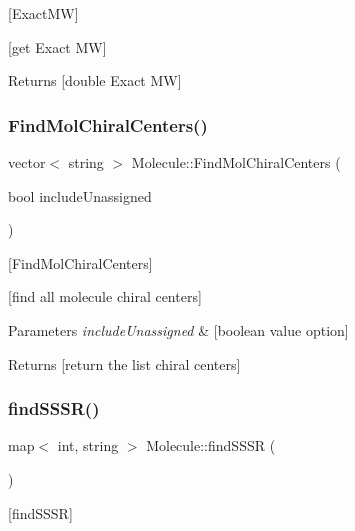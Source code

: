 \mbox{[}Exact\+MW\mbox{]} 

\mbox{[}get Exact MW\mbox{]}

\begin{DoxyReturn}{Returns}
\mbox{[}double Exact MW\mbox{]} 
\end{DoxyReturn}
\mbox{\label{class_molecule_a9befce09a7221276f628c79d28d6758f}} 
\subsubsection{\texorpdfstring{Find\+Mol\+Chiral\+Centers()}{FindMolChiralCenters()}}
{\footnotesize\ttfamily vector$<$ string $>$ Molecule\+::\+Find\+Mol\+Chiral\+Centers (\begin{DoxyParamCaption}\item[{bool}]{include\+Unassigned }\end{DoxyParamCaption})}



\mbox{[}Find\+Mol\+Chiral\+Centers\mbox{]} 

\mbox{[}find all molecule chiral centers\mbox{]}


\begin{DoxyParams}{Parameters}
{\em include\+Unassigned} & \mbox{[}boolean value option\mbox{]} \\
\hline
\end{DoxyParams}
\begin{DoxyReturn}{Returns}
\mbox{[}return the list chiral centers\mbox{]} 
\end{DoxyReturn}
\mbox{\label{class_molecule_a553c6c6f1543156da2ff00c859f6b508}} 
\subsubsection{\texorpdfstring{find\+S\+S\+S\+R()}{findSSSR()}}
{\footnotesize\ttfamily map$<$ int, string $>$ Molecule\+::find\+S\+S\+SR (\begin{DoxyParamCaption}{ }\end{DoxyParamCaption})}



\mbox{[}find\+S\+S\+SR\mbox{]} 

